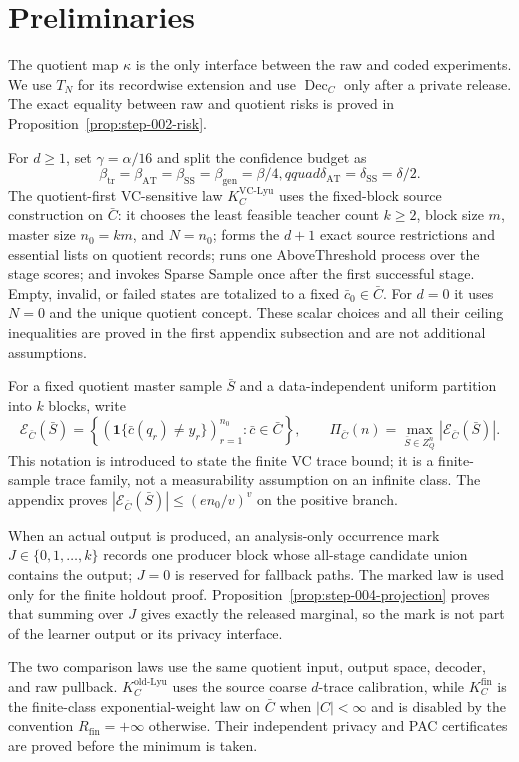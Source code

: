 \section{Preliminaries}

The quotient map $\kappa$ is the only interface between the raw and coded
experiments.  We use $T_N$ for its recordwise extension and use
$\operatorname{Dec}_C$ only after a private release.  The exact equality
between raw and quotient risks is proved in Proposition~\ref{prop:step-002-risk}.

For $d\ge1$, set $\gamma=\alpha/16$ and split the confidence budget as
\[
 \beta_{\mathrm{tr}}=\beta_{\mathrm{AT}}=\beta_{\mathrm{SS}}
 =\beta_{\mathrm{gen}}=\beta/4,qquad
 \delta_{\mathrm{AT}}=\delta_{\mathrm{SS}}=\delta/2.
\]
The quotient-first VC-sensitive law $K_C^{\mathrm{VC\text{-}Lyu}}$ uses the
fixed-block source construction on $\bar C$: it chooses the least feasible
teacher count $k\ge2$, block size $m$, master size $n_0=km$, and $N=n_0$;
forms the $d+1$ exact source restrictions and essential lists on quotient
records; runs one AboveThreshold process over the stage scores; and invokes
Sparse Sample once after the first successful stage.  Empty, invalid, or
failed states are totalized to a fixed $\bar c_0\in\bar C$.  For $d=0$ it
uses $N=0$ and the unique quotient concept.  These scalar choices and all
their ceiling inequalities are proved in the first appendix subsection and
are not additional assumptions.

For a fixed quotient master sample $\bar S$ and a data-independent uniform
partition into $k$ blocks, write
\[
 \mathcal E_{\bar C}(\bar S)=
 \left\{(\mathbf 1\{\bar c(q_r)\ne y_r\})_{r=1}^{n_0}:\bar c\in\bar C\right\},
 \qquad
 \Pi_{\bar C}(n)=\max_{\bar S\in Z_Q^n}|\mathcal E_{\bar C}(\bar S)|.
\]
This notation is introduced to state the finite VC trace bound; it is a
finite-sample trace family, not a measurability assumption on an infinite
class.  The appendix proves
$|\mathcal E_{\bar C}(\bar S)|\le(en_0/v)^v$ on the positive branch.

When an actual output is produced, an analysis-only occurrence mark
$J\in\{0,1,\ldots,k\}$ records one producer block whose all-stage candidate
union contains the output; $J=0$ is reserved for fallback paths.  The marked
law is used only for the finite holdout proof.  Proposition~\ref{prop:step-004-projection}
proves that summing over $J$ gives exactly the released marginal, so the
mark is not part of the learner output or its privacy interface.

The two comparison laws use the same quotient input, output space, decoder,
and raw pullback.  $K_C^{\mathrm{old\text{-}Lyu}}$ uses the source coarse
$d$-trace calibration, while $K_C^{\mathrm{fin}}$ is the finite-class
exponential-weight law on $\bar C$ when $|C|<\infty$ and is disabled by the
convention $R_{\mathrm{fin}}=+\infty$ otherwise.  Their independent privacy
and PAC certificates are proved before the minimum is taken.


